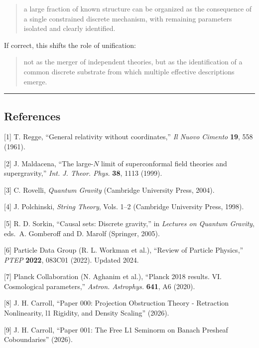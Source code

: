 \documentclass[
]{article}
\begin{document}
\begin{quote}
a large fraction of known structure can be organized as the consequence
of a single constrained discrete mechanism, with remaining parameters
isolated and clearly identified.
\end{quote}

If correct, this shifts the role of unification:

\begin{quote}
not as the merger of independent theories, but as the identification of
a common discrete substrate from which multiple effective descriptions
emerge.
\end{quote}

\begin{center}\rule{0.5\linewidth}{0.5pt}\end{center}

\subsection{References}\label{references}

{[}1{]} T. Regge, ``General relativity without coordinates,'' \emph{Il
Nuovo Cimento} \textbf{19}, 558 (1961).

{[}2{]} J. Maldacena, ``The large-\(N\) limit of superconformal field
theories and supergravity,'' \emph{Int. J. Theor. Phys.} \textbf{38},
1113 (1999).

{[}3{]} C. Rovelli, \emph{Quantum Gravity} (Cambridge University Press,
2004).

{[}4{]} J. Polchinski, \emph{String Theory}, Vols. 1--2 (Cambridge
University Press, 1998).

{[}5{]} R. D. Sorkin, ``Causal sets: Discrete gravity,'' in
\emph{Lectures on Quantum Gravity}, eds.~A. Gomberoff and D. Marolf
(Springer, 2005).

{[}6{]} Particle Data Group (R. L. Workman et al.), ``Review of Particle
Physics,'' \emph{PTEP} \textbf{2022}, 083C01 (2022). Updated 2024.

{[}7{]} Planck Collaboration (N. Aghanim et al.), ``Planck 2018 results.
VI. Cosmological parameters,'' \emph{Astron. Astrophys.} \textbf{641},
A6 (2020).

{[}8{]} J. H. Carroll, ``Paper 000: Projection Obstruction Theory -
Retraction Nonlinearity, l1 Rigidity, and Density Scaling'' (2026).

{[}9{]} J. H. Carroll, ``Paper 001: The Free L1 Seminorm on Banach
Presheaf Coboundaries'' (2026).
\end{document}
